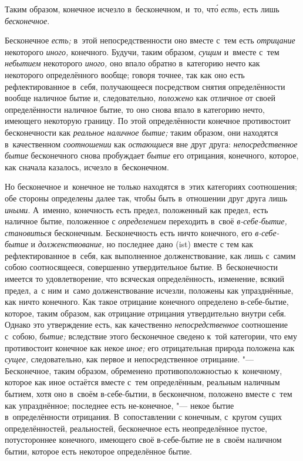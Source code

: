 Таким образом, конечное исчезло в~бесконечном,
и~то, чт\'{о} {\em есть,} есть лишь {\em бесконечное}.


Бесконечное {\em есть;} в~этой непосредственности оно
вместе с~тем есть {\em отрицание} некоторого
{\em иного,} конечного. Будучи, таким образом,
{\em сущим} и~вместе с~тем {\em небытием} некоторого
{\em иного,} оно впало обратно в~категорию нечто как
некоторого определённого вообще; говоря точнее, так как оно есть
рефлектированное в~себя, получающееся посредством снятия определённости
вообще наличное бытие и, следовательно, {\em положено}
как отличное от своей определённости наличное бытие, то оно снова впало в
категорию нечто, имеющего некоторую границу. По этой определённости
конечное противостоит бесконечности как {\em реальное
наличное бытие;} таким образом, они находятся в~качественном
{\em соотношении} как
{\em остающиеся} вне друг друга:
{\em непосредственное бытие} бесконечного снова
пробуждает {\em бытие} его отрицания, конечного,
которое, как сначала казалось, исчезло в~бесконечном.

Но бесконечное и~конечное не только находятся в~этих категориях соотношения;
обе стороны определены далее так, чтобы быть в~отношении друг друга лишь
{\em иными}. А~именно, конечность есть предел,
положенный как предел, есть наличное бытие, положенное с
{\em определением} переходить в~своё
{\em в-себе-бытие,}
{\em становиться} бесконечным. Бесконечность есть ничто
конечного, его {\em в-себе-бытие} и
{\em долженствование,} но последнее дано (ist) вместе с
тем как рефлектированное в~себя, как выполненное долженствование, как лишь
с~самим собою соотносящееся, совершенно утвердительное бытие.
В~бесконечности имеется то удовлетворение, что всяческая определённость,
изменение, всякий предел, а~с ним и~само долженствование исчезли, положены
как упразднённые, как ничто конечного. Как такое отрицание конечного
определено в-себе-бытие, которое, таким образом, как отрицание отрицания
утвердительно внутри себя. Однако это утверждение есть, как качественно
{\em непосредственное} соотношение с~собою,
{\em бытие;} вследствие этого бесконечное сведено к~той
категории, что ему противостоит конечное как некое
{\em иное;} его отрицательная природа положена как
{\em сущее,} следовательно, как первое и
непосредственное отрицание. "--- Бесконечное, таким образом, обременено
противоположностью к~конечному, которое как иное остаётся вместе с~тем
определённым, реальным наличным бытием, хотя оно в~своём в-себе-бытии, в
бесконечном, положено вместе с~тем как упразднённое; последнее есть
не-конечное, "--- некое бытие в~определённости отрицания. В~сопоставлении с
конечным, с~кругом сущих определённостей, реальностей, бесконечное есть
неопределённое пустое, потустороннее конечного, имеющего своё в-себе-бытие
не в~своём наличном бытии, которое есть некоторое определённое бытие.

